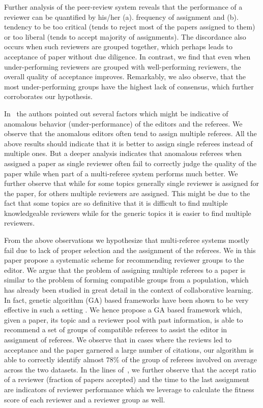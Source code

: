Further analysis of the peer-review system reveals that 
the performance of a reviewer can be quantified by his/her  
 (a). frequency of assignment and (b). tendency to be too critical (tends to reject most of the papers assigned to them) 
or too liberal (tends to accept majority of assignments). The discordance also occurs when such reviewers are grouped together, which perhaps
leads to acceptance of paper without due diligence. In contrast, we find that even when under-performing
reviewers are grouped with well-performing reviewers, the overall quality of acceptance improves. 
Remarkably, we also observe, that the most under-performing groups have the highest lack of consensus, which further corroborates our hypothesis.

In~\cite{sikdar2016anomalies} the authors pointed out several factors which might be indicative of anomalous behavior (under-performance) of 
the editors and the referees. We observe 
that the anomalous editors often tend to assign multiple referees. All the above results should indicate that it is better to assign single referees instead 
of multiple ones. But a deeper analysis indicates that anomalous referees when assigned a paper as single reviewer often fail to correctly judge the 
quality of the paper while when part of a multi-referee system performs much better. We further observe that while for some topics generally single reviewer 
is assigned for the paper, for others multiple reviewers are assigned. This might be due to the fact that some topics are so definitive that it is difficult 
to find multiple knowledgeable reviewers while for the generic topics it is easier to find multiple reviewers.
\fi


From the above observations we hypothesize that multi-referee systems mostly fail due to lack of proper selection and the assignment of the referees. 
We in this paper propose a systematic scheme 
for recommending reviewer groups to the editor. We argue that the problem of assigning multiple referees to a paper is similar to the problem of forming compatible 
groups from a population, which has already been studied in great detail in the context of collaborative learning. In fact, genetic algorithm (GA) 
based frameworks have been shown to be very effective in such a setting \cite{moreno2012genetic,ani2010method}. 
We hence propose a GA based framework which, given a paper, 
its topic and a reviewer pool with past information, is able to recommend a 
set of groups of compatible referees to assist the editor in assignment of referees. 
We observe that in cases where the reviews led to acceptance and the paper garnered a 
large number of citations, our algorithm is able to correctly identify almost \textbf{ $78\%$} of the group of referees 
involved on average across the two datasets. 
In the lines of~\cite{sikdar2016anomalies}, we further observe that the accept ratio of a 
reviewer (fraction of papers accepted) and the time to the last assignment are indicators of reviewer performance which we leverage to calculate 
the fitness score of each reviewer and a reviewer group as well.  
\fi

